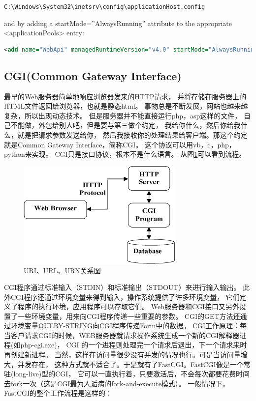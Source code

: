 \documentclass{book}
\begin{document}
\begin{lstlisting}
C:\Windows\System32\inetsrv\config\applicationHost.config
\end{lstlisting}

and by adding a startMode=”AlwaysRunning” attribute to the appropriate <applicationPools> entry:

\begin{lstlisting}[language=XML]
<add name="WebApi" managedRuntimeVersion="v4.0" startMode="AlwaysRunning"/>
\end{lstlisting}

\subsection{CGI(Common Gateway Interface)}

最早的Web服务器简单地响应浏览器发来的HTTP请求，
并将存储在服务器上的HTML文件返回给浏览器，也就是静态html。
事物总是不断发展，网站也越来越复杂，所以出现动态技术。
但是服务器并不能直接运行php，asp这样的文件，
自己不能做，外包给别人吧，但是要与第三做个约定，
我给你什么，然后你给我什么，就是把请求参数发送给你，
然后我接收你的处理结果给客户端。那这个约定就是Common Gateway Interface，简称CGI。
这个协议可以用vb，c，php，python来实现。
CGI只是接口协议，根本不是什么语言。
从图\ref{fig:CGIHandleWorkflow}可以看到流程。

\begin{figure}[htbp]
	\centering
	\includegraphics[scale=0.8]{CGIHandleWorkflow.png}
	\caption{URI、URL、URN关系图}
	\label{fig:CGIHandleWorkflow}
\end{figure}

CGI程序通过标准输入（STDIN）和标准输出（STDOUT）来进行输入输出。
此外CGI程序还通过环境变量来得到输入，操作系统提供了许多环境变量，
它们定义了程序的执行环境，应用程序可以存取它们。
Web服务器和CGI接口又另外设置了一些环境变量，用来向CGI程序传递一些重要的参数。
CGI的GET方法还通过环境变量QUERY-STRING向CGI程序传递Form中的数据。
CGI工作原理：每当客户请求CGI的时候，WEB服务器就请求操作系统生成一个新的CGI解释器进程(如php-cgi.exe)，
CGI 的一个进程则处理完一个请求后退出，下一个请求来时再创建新进程。
当然，这样在访问量很少没有并发的情况也行。可是当访问量增大，并发存在，
这种方式就不适合了。于是就有了FastCGI。FastCGI像是一个常驻(long-live)型的CGI，
它可以一直执行着，只要激活后，不会每次都要花费时间去fork一次（这是CGI最为人诟病的fork-and-execute模式）。
一般情况下，FastCGI的整个工作流程是这样的：
\end{document}
